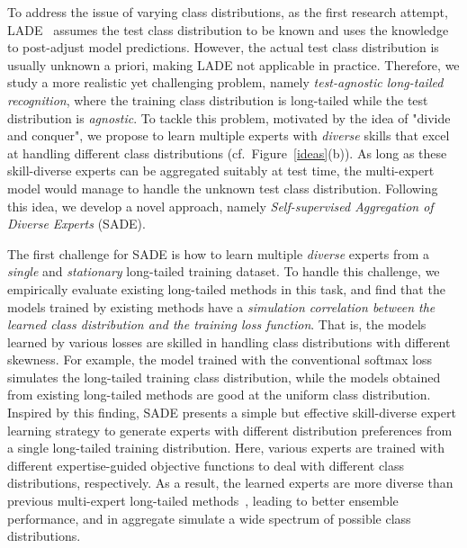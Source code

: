 \documentclass{article}
\begin{document}
 


To address the issue of varying class distributions, as the first research attempt,  LADE~\cite{hong2020disentangling}  assumes   the test class distribution to be known  and uses the knowledge to post-adjust model predictions. However, the actual test class distribution is usually unknown  a priori, making LADE not applicable in practice.  Therefore, we    study   a more realistic yet challenging    problem,  namely \textit{test-agnostic long-tailed recognition}, where the training class distribution is long-tailed  while the test  distribution is  \emph{agnostic}. 
To tackle this problem,  motivated by the idea of "divide and conquer",  we propose to learn multiple experts with \emph{diverse} skills that excel at handling different class distributions (cf.~Figure~\ref{ideas}(b)). As long as these skill-diverse experts can be aggregated suitably at test time, the  multi-expert model would manage to handle the  unknown test class distribution.  
Following this idea, we develop a novel approach, namely \emph{Self-supervised Aggregation of Diverse Experts} (SADE).
 


The first challenge for SADE  is how to learn multiple \emph{diverse} experts from a  \emph{single} and  \emph{stationary} long-tailed training dataset.
To handle this challenge,  we   empirically evaluate existing long-tailed methods in this task, and find     that  the  models trained by existing  methods have a \emph{simulation correlation between the learned class distribution and the training loss function}. That is, the models learned by various losses are skilled in handling class distributions with different skewness. For example, the model trained with the conventional softmax loss simulates the long-tailed training class distribution, while the models obtained from existing  long-tailed methods are good at the uniform class distribution. Inspired by this finding, SADE presents a simple but effective skill-diverse expert learning strategy  to generate     experts  with different distribution preferences from   a single long-tailed training distribution. Here, various experts are trained with different   expertise-guided objective functions  to  deal with different  class distributions, respectively. 
As a result, the learned  experts are  more diverse than  previous multi-expert long-tailed methods~\cite{wang2020long,zhou2020bbn}, leading to  better ensemble performance, and  in aggregate   simulate a wide spectrum of possible  class distributions. 
\end{document}
